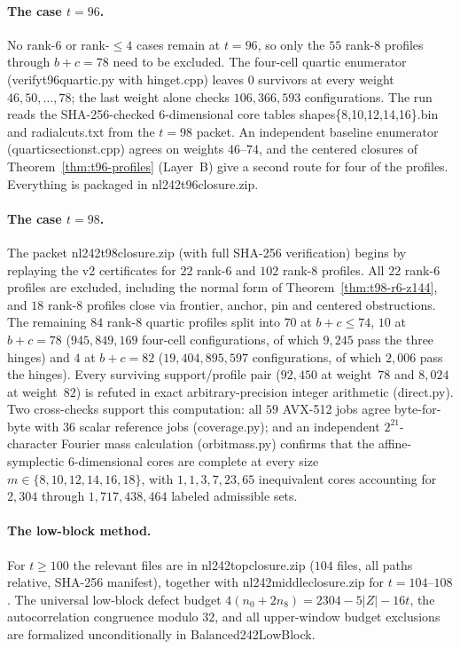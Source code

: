 \documentclass[11pt]{article}
\theoremstyle{definition}
\newcommand{\code}[1]{{\ttfamily\small\renewcommand{\_}{\textunderscore\allowbreak}#1}}
\begin{document}
\paragraph{The case $t = 96$.}
No rank-$6$ or rank-$\le 4$ cases remain at $t = 96$, so only the $55$ rank-$8$ profiles through $b+c = 78$ need to be excluded.
The four-cell quartic enumerator (\code{verify\_t96\_quartic.py} with \code{hinge\_t.cpp}) leaves $0$ survivors at every weight $46, 50, \dots, 78$; the last weight alone checks $106{,}366{,}593$ configurations.
The run reads the SHA-256-checked $6$-dimensional core tables \code{shapes\{8,10,12,14,16\}.bin} and \code{radial\_cuts.txt} from the $t = 98$ packet.
An independent baseline enumerator (\code{quartic\_sections\_t.cpp}) agrees on weights $46$--$74$, and the centered closures of Theorem~\ref{thm:t96-profiles} (Layer~B) give a second route for four of the profiles.
Everything is packaged in \code{nl242\_t96\_closure.zip}.

\paragraph{The case $t = 98$.}
The packet \code{nl242\_t98\_closure.zip} (with full SHA-256 verification) begins by replaying the v2 certificates for $22$ rank-$6$ and $102$ rank-$8$ profiles.
All $22$ rank-$6$ profiles are excluded, including the normal form of Theorem~\ref{thm:t98-r6-z144}, and $18$ rank-$8$ profiles close via frontier, anchor, pin and centered obstructions.
The remaining $84$ rank-$8$ quartic profiles split into $70$ at $b+c \le 74$, $10$ at $b+c = 78$ ($945{,}849{,}169$ four-cell configurations, of which $9{,}245$ pass the three hinges) and $4$ at $b+c = 82$ ($19{,}404{,}895{,}597$ configurations, of which $2{,}006$ pass the hinges).
Every surviving support/profile pair ($92{,}450$ at weight~$78$ and $8{,}024$ at weight~$82$) is refuted in exact arbitrary-precision integer arithmetic (\code{direct.py}).
Two cross-checks support this computation: all $59$ AVX-512 jobs agree byte-for-byte with $36$ scalar reference jobs (\code{coverage.py}); and an independent $2^{21}$-character Fourier mass calculation (\code{orbit\_mass.py}) confirms that the affine-symplectic $6$-dimensional cores are complete at every size $m \in \{8, 10, 12, 14, 16, 18\}$, with $1, 1, 3, 7, 23, 65$ inequivalent cores accounting for $2{,}304$ through $1{,}717{,}438{,}464$ labeled admissible sets.

\paragraph{The low-block method.}
For $t \ge 100$ the relevant files are in \code{nl242\_top\_closure.zip} ($104$ files, all paths relative, SHA-256 manifest), together with \code{nl242\_middle\_closure.zip} for $t = 104$--$108$.
The universal low-block defect budget $4(n_0 + 2n_8) = 2304 - 5|Z| - 16t$, the autocorrelation congruence modulo $32$, and all upper-window budget exclusions are formalized unconditionally in \code{Balanced242LowBlock}.
\end{document}
